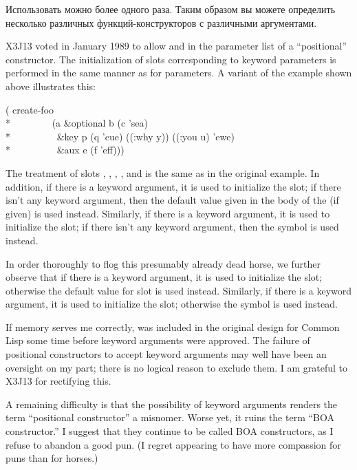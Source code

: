 Использовать  можно более одного раза. Таким образом вы можете
определить несколько различных функций-конструкторов с различными аргументами.

\begin{new}
X3J13 voted in January 1989
to allow  and 
in the
parameter list of a ``positional'' constructor.  The initialization of slots
corresponding to keyword parameters
is performed in the same manner as for  parameters.
A variant of the example shown above illustrates this:
\begin{lisp}
( create-foo \\*
~~~~~~~~(a \&optional b (c 'sea) \\*
~~~~~~~~~\&key p (q 'cue) ((:why y)) ((:you u) 'ewe) \\*
~~~~~~~~~\&aux e (f 'eff)))
\end{lisp}
The treatment of slots , , , , and 
is the same as in the original example.  In addition,
if there is a  keyword argument, it is
used to initialize the  slot;  if there isn't any
 keyword argument, then the default value given in the body of the
 (if given) is used instead.  Similarly,
if there is a  keyword argument, it is
used to initialize the  slot;  if there isn't any
 keyword argument, then
the symbol  is used instead.

In order thoroughly to flog this presumably already dead horse,
we further observe that if there is a  keyword argument, it is
used to initialize the  slot; otherwise
the default value for slot  is used instead.  Similarly,
if there is a  keyword argument, it is
used to initialize the  slot;  otherwise
the symbol  is used instead.

If memory serves me correctly,  was included in the original
design for Common Lisp some time before keyword arguments were approved.
The failure of positional constructors to accept keyword arguments may well
have been an oversight on my part; there is no logical reason to exclude
them.  I am grateful to X3J13 for rectifying this.

A remaining difficulty is that the possibility of keyword arguments
renders the term ``positional constructor'' a misnomer.  Worse yet,
it ruins the term ``BOA constructor.''  I suggest that
they continue to be called BOA constructors, as I refuse to abandon
a good pun.  (I regret appearing to have more compassion for puns than
for horses.)


\end{new}
